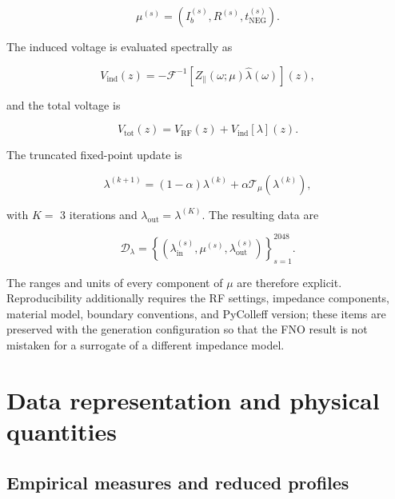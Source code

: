 \begin{equation}
\label{eq:41}
\mu^{(s)}=\left(I_b^{(s)},R^{(s)},t_{\mathrm{NEG}}^{(s)}\right).
\end{equation}

The induced voltage is evaluated spectrally as

\begin{equation}
\label{eq:42}
V_{\mathrm{ind}}(z)=-\mathcal F^{-1}\left[Z_{\parallel}(\omega;\mu)\widehat\lambda(\omega)\right](z),
\end{equation}

and the total voltage is

\begin{equation}
\label{eq:43}
V_{\mathrm{tot}}(z)=V_{\mathrm{RF}}(z)+V_{\mathrm{ind}}[\lambda](z).
\end{equation}

The truncated fixed-point update is

\begin{equation}
\label{eq:44}
\lambda^{(k+1)}=(1-\alpha)\lambda^{(k)}+\alpha\mathcal T_{\mu}\left(\lambda^{(k)}\right),
\end{equation}

with \(K =\) 3 iterations and \(\lambda_{\mathrm{out}} = \lambda^{( K )} .\) The resulting data are

\begin{equation}
\label{eq:45}
\mathcal D_{\lambda}=\left\{\left(\lambda_{\mathrm{in}}^{(s)},\mu^{(s)},\lambda_{\mathrm{out}}^{(s)}\right)\right\}_{s=1}^{2048}.
\end{equation}

The ranges and units of every component of \(\mu\) are therefore explicit. Reproducibility additionally requires the RF settings, impedance components, material model, boundary conventions, and PyColleff version; these items are preserved with the generation configuration so that the FNO result is not mistaken for a surrogate of a different impedance model.

\section{Data representation and physical quantities}
\label{sec:03_simulation_workflow_data_representation_and_physical_quantities}

\subsection{Empirical measures and reduced profiles}
\label{sec:03_simulation_workflow_empirical_measures_and_reduced_profiles}

